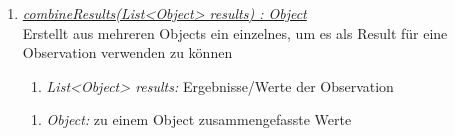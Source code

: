 \begin{enumerate}[+]
	\item \underline{\textit{combineResults(List<Object> results) : Object}}\\
	Erstellt aus mehreren Objects ein einzelnes, um es als Result für eine Observation verwenden zu können
	
	
	\begin{enumerate}[$\bullet$]
		\item \textit{List<Object> results:} Ergebnisse/Werte der Observation
	\end{enumerate}
	\vspace{-0.2cm}
	\begin{enumerate}[$\circ$]
		\item \textit{Object:} zu einem Object zusammengefasste Werte
	\end{enumerate}
	
	
\end{enumerate}